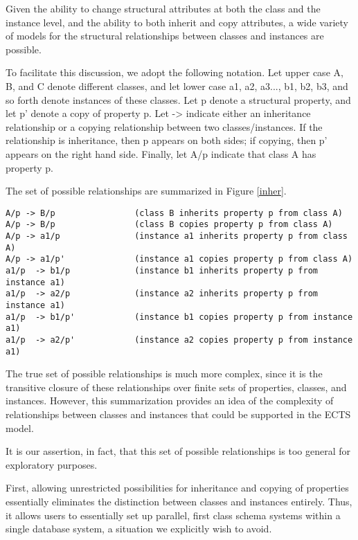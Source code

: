 Given the ability to change structural attributes at both the class
and the instance level, and the ability to both inherit and copy
attributes, a wide variety of models for the structural relationships
between classes and instances are possible.

To facilitate this discussion, we adopt the following notation.  Let upper case A, B,
and C denote different classes, and let lower case a1, a2, a3...,  b1, b2, b3, 
and so forth denote instances of these classes.  Let p denote a 
structural property, and let p' denote a copy of property p.   Let -> indicate 
either an inheritance relationship or a copying relationship between two 
classes/instances.  If the relationship is inheritance, then p appears on both 
sides; if copying, then p' appears on the right hand side.   Finally, let A/p 
indicate that class A has property p.

The set of possible relationships are summarized in Figure \ref{inher}.

\begin{figure*}
\figureline
\small\begin{verbatim}
A/p -> B/p                (class B inherits property p from class A)
A/p -> B/p                (class B copies property p from class A)
A/p -> a1/p               (instance a1 inherits property p from class A)
A/p -> a1/p'              (instance a1 copies property p from class A)
a1/p  -> b1/p             (instance b1 inherits property p from instance a1)
a1/p  -> a2/p             (instance a2 inherits property p from instance a1)
a1/p  -> b1/p'            (instance b1 copies property p from instance a1)
a1/p  -> a2/p'            (instance a2 copies property p from instance a1)
\end{verbatim}\normalsize
\figureline
\caption{Possible inheritance relationships}
\label{inher}
\end{figure*}

The true set of possible relationships is much more complex, since it is the 
transitive closure of these relationships over finite sets of properties, 
classes, and instances.  However, this summarization provides an idea of the 
complexity of relationships between classes and instances that could be 
supported in the ECTS model.

It is our assertion, in fact, that this set of possible relationships is too 
general for exploratory purposes.  

First, allowing unrestricted possibilities for inheritance and copying of 
properties essentially eliminates the distinction between classes and instances
entirely.  Thus, it allows users to essentially set up parallel, first class 
schema systems within a single database system, a situation we explicitly wish 
to avoid.  

